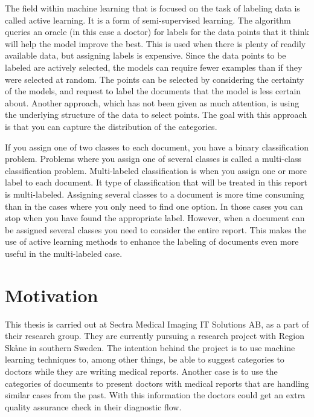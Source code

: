 The field within machine learning that is focused on the task of labeling data is called active learning.
It is a form of semi-supervised learning.
The algorithm queries an oracle (in this case a doctor) for labels for the data points that it think will help the model improve the best.
This is used when there is plenty of readily available data, but assigning labels is expensive.
Since the data points to be labeled are actively selected, the models can require fewer examples than if they were selected at random.
The points can be selected by considering the certainty of the models, and request to label the documents that the model is less certain about.
Another approach, which has not been given as much attention, is using the underlying structure of the data to select points.
The goal with this approach is that you can capture the distribution of the categories.

If you assign one of two classes to each document, you have a binary classification problem.
Problems where you assign one of several classes is called a multi-class classification problem.
Multi-labeled classification is when you assign one or more label to each document.
It type of classification that will be treated in this report is multi-labeled.
Assigning several classes to a document is more time consuming than in the cases where you only need to find one option.
In those cases you can stop when you have found the appropriate label.
However, when a document can be assigned several classes you need to consider the entire report.
This makes the use of active learning methods to enhance the labeling of documents even more useful in the multi-labeled case.

\section{Motivation}
\label{sec:motivation}

This thesis is carried out at Sectra Medical Imaging IT Solutions AB, as a part of their research group.
They are currently pursuing a research project with Region Skåne in southern Sweden.
The intention behind the project is to use machine learning techniques to, among other things, be able to suggest categories to doctors while they are writing medical reports.
Another case is to use the categories of documents to present doctors with medical reports that are handling similar cases from the past.
With this information the doctors could get an extra quality assurance check in their diagnostic flow.


